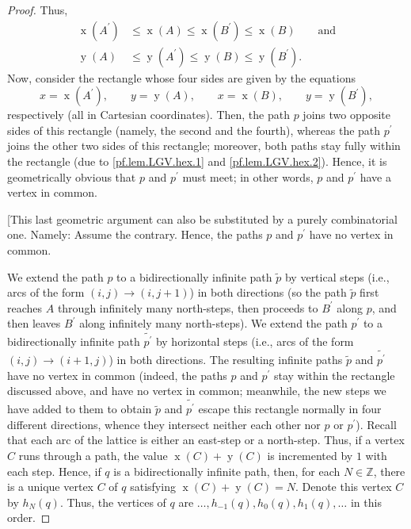 \documentclass[reqno]{amsart}%
\newcommand{\0}{\phantom{c}}
\newenvironment{verlong}{}{}
\theoremstyle{plain}
\theoremstyle{definition}
\numberwithin{equation}{section}
\begin{document}
\begin{verlong}
\begin{proof}
Thus,%
\begin{align}
\operatorname*{x}\left(  A^{\prime}\right)   &  \leq\operatorname*{x}\left(
A\right)  \leq\operatorname*{x}\left(  B^{\prime}\right)  \leq
\operatorname*{x}\left(  B\right)  \qquad\text{and}\label{pf.lem.LGV.hex.1}\\
\operatorname*{y}\left(  A\right)   &  \leq\operatorname*{y}\left(  A^{\prime
}\right)  \leq\operatorname*{y}\left(  B\right)  \leq\operatorname*{y}\left(
B^{\prime}\right)  . \label{pf.lem.LGV.hex.2}%
\end{align}
Now, consider the rectangle whose four sides are given by the equations%
\[
x=\operatorname*{x}\left(  A^{\prime}\right)  ,\qquad y=\operatorname*{y}%
\left(  A\right)  ,\qquad x=\operatorname*{x}\left(  B\right)  ,\qquad
y=\operatorname*{y}\left(  B^{\prime}\right)  ,
\]
respectively (all in Cartesian coordinates). Then, the path $p$ joins two
opposite sides of this rectangle (namely, the second and the fourth), whereas
the path $p^{\prime}$ joins the other two sides of this rectangle; moreover,
both paths stay fully within the rectangle (due to \eqref{pf.lem.LGV.hex.1}
and \eqref{pf.lem.LGV.hex.2}). Hence, it is geometrically obvious that $p$ and
$p^{\prime}$ must meet; in other words, $p$ and $p^{\prime}$ have a vertex in common.

[This last geometric argument can also be substituted by a purely
combinatorial one. Namely: Assume the contrary. Hence, the paths $p$ and
$p^{\prime}$ have no vertex in common.

We extend the path $p$ to a bidirectionally infinite path $\widetilde{p}$ by
vertical steps (i.e., arcs of the form $\left(  i,j\right)  \rightarrow\left(
i,j+1\right)  $) in both directions (so the path $\widetilde{p}$ first reaches
$A$ through infinitely many north-steps, then proceeds to $B^{\prime}$ along
$p$, and then leaves $B^{\prime}$ along infinitely many north-steps). We
extend the path $p^{\prime}$ to a bidirectionally infinite path
$\widetilde{p^{\prime}}$ by horizontal steps (i.e., arcs of the form $\left(
i,j\right)  \rightarrow\left(  i+1,j\right)  $) in both directions. The
resulting infinite paths $\widetilde{p}$ and $\widetilde{p^{\prime}}$ have no
vertex in common (indeed, the paths $p$ and $p^{\prime}$ stay within the
rectangle discussed above, and have no vertex in common; meanwhile, the new
steps we have added to them to obtain $\widetilde{p}$ and
$\widetilde{p^{\prime}}$ escape this rectangle normally in four different
directions, whence they intersect neither each other nor $p$ or $p^{\prime}$).
Recall that each arc of the lattice is either an east-step or a north-step.
Thus, if a vertex $C$ runs through a path, the value $\operatorname*{x}\left(
C\right)  +\operatorname*{y}\left(  C\right)  $ is incremented by $1$ with
each step. Hence, if $q$ is a bidirectionally infinite path, then, for each
$N\in\mathbb{Z}$, there is a unique vertex $C$ of $q$ satisfying
$\operatorname*{x}\left(  C\right)  +\operatorname*{y}\left(  C\right)  =N$.
Denote this vertex $C$ by $h_{N}\left(  q\right)  $. Thus, the vertices of $q$
are $\ldots,h_{-1}\left(  q\right)  ,h_{0}\left(  q\right)  ,h_{1}\left(
q\right)  ,\ldots$ in this order.


\end{proof}
\end{verlong}
\end{document}
